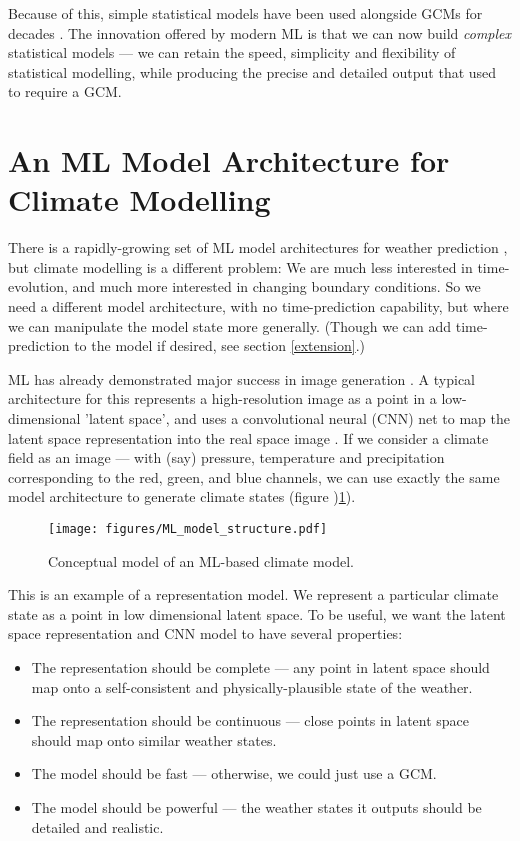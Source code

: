 \documentclass[gmd]{copernicus}
\begin{document}
Because of this, simple statistical models have been used alongside GCMs for decades \citep{MAGICC}. The innovation offered by modern ML is that we can now build {\it complex} statistical models --- we can retain the speed, simplicity and flexibility of statistical modelling, while producing the precise and detailed output that used to require a GCM.

\section{An ML Model Architecture for Climate Modelling}

There is a rapidly-growing set of ML model architectures for weather prediction \citep{keisler2022forecasting,bi2022panguweather,nguyen2023climax}, but climate modelling is a different problem: We are much less interested in time-evolution, and much more interested in changing boundary conditions. So we need a different model architecture, with no time-prediction capability, but where we can manipulate the model state more generally. (Though we can add time-prediction to the model if desired, see section \ref{extension}.)

ML has already demonstrated major success in image generation \citep{StyleGAN2,Stable_Diffusion}. A typical architecture for this represents a high-resolution image as a point in a low-dimensional 'latent space', and uses a convolutional neural (CNN) net to map the latent space representation into the real space image \citep{StyleGAN}. If we consider a climate field as an image --- with (say) pressure, temperature and precipitation corresponding to the red, green, and blue channels, we can use exactly the same model architecture to generate climate states (figure )\ref{ML_model_structure}).

\begin{figure}[h]
\texttt{[image: figures/ML\_model\_structure.pdf]}
\caption{Conceptual model of an ML-based climate model.}
\label{ML_model_structure}
\end{figure}

This is an example of a representation model. We represent a particular climate state as a point in low dimensional latent space. To be useful, we want the latent space representation and CNN model to have several properties:
\begin{itemize}
    \item The representation should be complete --- any point in latent space should map onto a self-consistent and physically-plausible state of the weather.
    \item The representation should be continuous --- close points in latent space should map onto similar weather states.
    \item The model should be fast --- otherwise, we could just use a GCM.
    \item The model should be powerful --- the weather states it outputs should be detailed and realistic.
\end{itemize}
\end{document}

